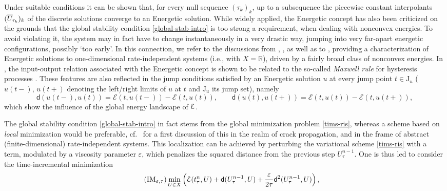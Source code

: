 \documentclass[a4paper,10pt,reqno]{amsart} %
\newcommand{\R}{\mathbb{R}}
\numberwithin{equation}{section}
\newcommand{\eps}{\varepsilon}
\newcommand{\Xs}{X}
\newcommand{\mdn}{\mathsf{d}}
\newcommand{\md}[2]{\mathsf{d}(#1,#2)}
\newcommand{\ene}[2]{\mathcal{E}(#1,#2)}
\newcommand{\ds}[3]{{#1}_{#2}^{#3}}
\newcommand{\lli}[2]{{#1}({#2}{-})}
\newcommand{\rli}[2]{{#1}({#2}{+})}
\newcommand{\jump}[1]{\mathrm{J}_{#1}}
\newcommand{\piecewiseConstant}[2]{\overline{#1}_{\kern-1pt#2}}
\newcommand{\pwc}{\piecewiseConstant}
\begin{document}
Under suitable conditions it can be shown that, for every null sequence $(\tau_k)_k$, up to a subsequence the
  piecewise constant interpolants $(\pwc U{\tau_k})_k$ of the discrete solutions converge to  an Energetic solution.
  While widely applied,  the Energetic concept has also been criticized on the grounds that the global stability condition 
  \eqref{global-stab-intro} is too strong a requirement, when dealing with nonconvex energies. To avoid violating it, the system may in fact have to 
change instantaneously in a very drastic way, jumping into very far-apart energetic
  configurations, possibly `too early'. In this connection, we refer to the discussions from  \cite[Ex.\ 6.3]{KnMiZa07?ILMC}, \cite[Ex.\ 6.1]{MRS09}, as well as to  \cite{RosSav12}, providing  a characterization of Energetic solutions to one-dimensional 
  rate-independent systems (i.e., with $\Xs=\R$), driven by a fairly broad class of nonconvex  energies. 
  In \cite{RosSav12}, the input-output relation associated with the Energetic concept is shown to be related to the so-called \emph{Maxwell rule} for hysteresis processes \cite{Visintin94}. 
  These features are also reflected in the jump conditions satisfied by an Energetic solution $u$ at every jump point $t
  \in \jump u$ ($\lli u t$, $\rli u t $ denoting the left/right limits of $u$ at $t$ and  $\jump u$ its jump set),  namely
  \begin{equation}
  \label{jump-intro-energetic}
  \md {\lli u t }{u(t)} = \ene t{\lli u t } -\ene t{u(t)}, \qquad \md {u(t)}{\rli u t} = \ene t{u(t)} - \ene t {\rli u t },
  \end{equation}
  which show the influence of the global energy landscape of ${\mathcal E}$.
\par
The global stability  condition \eqref{global-stab-intro} in fact stems from the 
  global minimization problem \eqref{tims-ris}, whereas a scheme based on \emph{local} minimization would be preferable, cf.\ \cite{DT02MQGB} for a first discussion of this  in the realm of crack propagation,
  and \cite{EfeMie06RILS} in the frame of abstract (finite-dimensional) rate-independent systems. This localization can be achieved by perturbing the variational scheme \eqref{tims-ris}
 with
a term, modulated by a viscosity parameter $\eps$, which penalizes the squared distance from the previous step $\ds U\tau{n-1}$. One is thus led to consider the  time-incremental minimization   
\begin{equation}
\label{tims-bv}
\tag{$\mathrm{IM}_{\eps,\tau}$}
\min_{U\in \Xs} \left( \ene{\ds t \tau  n}{U}+ \md{\ds U\tau{n-1}}{U} + \frac{\eps}{2\tau}   \mdn^2(\ds U\tau{n-1},U)  \right),
\end{equation}
\end{document}
